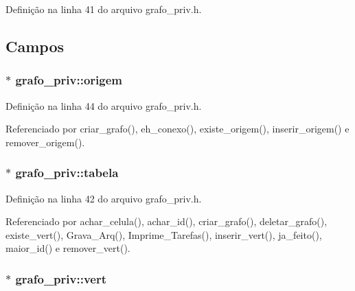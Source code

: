 Definição na linha 41 do arquivo grafo\+\_\+priv.\+h.



\subsection{Campos}
\hypertarget{structgrafo__priv_a49b9f7cfbed0b2dff3c5b373d79385db}{}
\subsubsection[{origem}]{$\ast$ grafo\+\_\+priv\+::origem}\label{structgrafo__priv_a49b9f7cfbed0b2dff3c5b373d79385db}


Definição na linha 44 do arquivo grafo\+\_\+priv.\+h.



Referenciado por criar\+\_\+grafo(), eh\+\_\+conexo(), existe\+\_\+origem(), inserir\+\_\+origem() e remover\+\_\+origem().

\hypertarget{structgrafo__priv_a7aaee4699517501a8ca504043ef78ddb}{}
\subsubsection[{tabela}]{$\ast$ grafo\+\_\+priv\+::tabela}\label{structgrafo__priv_a7aaee4699517501a8ca504043ef78ddb}


Definição na linha 42 do arquivo grafo\+\_\+priv.\+h.



Referenciado por achar\+\_\+celula(), achar\+\_\+id(), criar\+\_\+grafo(), deletar\+\_\+grafo(), existe\+\_\+vert(), Grava\+\_\+\+Arq(), Imprime\+\_\+\+Tarefas(), inserir\+\_\+vert(), ja\+\_\+feito(), maior\+\_\+id() e remover\+\_\+vert().

\hypertarget{structgrafo__priv_a6f7e609364c2e69e02c56860b1a2c3ad}{}
\subsubsection[{vert}]{$\ast$ grafo\+\_\+priv\+::vert}\label{structgrafo__priv_a6f7e609364c2e69e02c56860b1a2c3ad}


